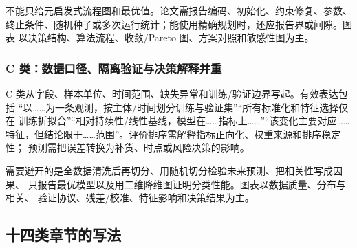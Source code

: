 \documentclass[UTF8,a4paper,12pt]{ctexart}
\begin{document}
不能只给元启发式流程图和最优值。论文需报告编码、初始化、约束修复、参数、
终止条件、随机种子或多次运行统计；能使用精确规划时，还应报告界或间隙。图表
以决策结构、算法流程、收敛/Pareto 图、方案对照和敏感性图为主。

\subsubsection{C 类：数据口径、隔离验证与决策解释并重}

C 类从字段、样本单位、时间范围、缺失异常和训练/验证边界写起。有效表达包括
“以……为一条观测，按主体/时间划分训练与验证集”“所有标准化和特征选择仅在
训练折拟合”“相对持续性/线性基线，模型在……指标上……”“该变化主要对应……
特征，但结论限于……范围”。评价排序需解释指标正向化、权重来源和排序稳定性；
预测需把误差转换为补货、时点或风险决策的影响。

需要避开的是全数据清洗后再切分、用随机切分检验未来预测、把相关性写成因果、
只报告最优模型以及用二维降维图证明分类性能。图表以数据质量、分布与相关、
验证协议、残差/校准、特征影响和决策结果为主。

\subsection{十四类章节的写法}
\end{document}
